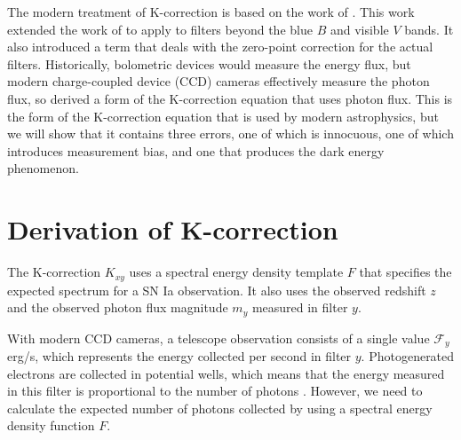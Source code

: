 The modern treatment of K-correction is based on the work of \citet{kim1996}.
This work extended the work of \citet{oke1968} to apply to filters beyond the
blue $B$ and visible $V$ bands. It also introduced a term that deals with the
zero-point correction for the actual filters. Historically, bolometric devices
would measure the energy flux, but modern charge-coupled device (CCD) cameras
effectively measure the photon flux, so \citet{kim1996} derived a form of the
K-correction equation that uses photon flux. This is the form of the
K-correction equation that is used by modern astrophysics, but we will show
that it contains three errors, one of which is innocuous, one of which
introduces measurement bias, and one that produces the dark energy phenomenon.

\section{Derivation of K-correction}

The K-correction $K_{xy}$ uses a spectral energy density template $F$ that
specifies the expected spectrum for a SN Ia observation. It also uses the
observed redshift $z$ and the observed photon flux magnitude $m_y$ measured in
filter $y$.

With modern CCD cameras, a telescope observation consists of a single value
$\mathcal{F}_y$ erg/s, which represents the energy collected per second in
filter $y$. Photogenerated electrons are collected in potential wells, which
means that the energy measured in this filter is proportional to the number of
photons \citep{lesser2015}. However, we need to calculate the expected number
of photons collected by using a spectral energy density function $F$.

